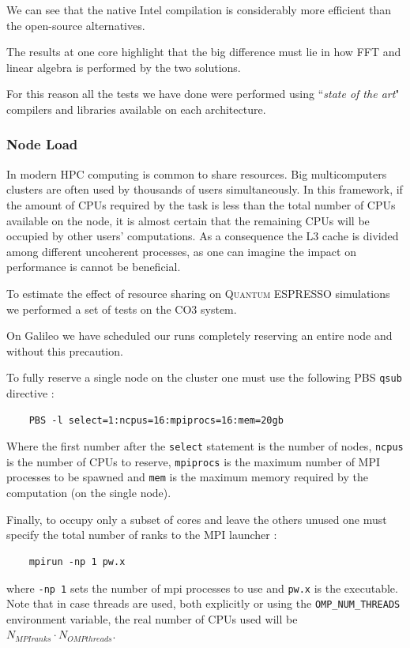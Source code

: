 \documentclass[a4paper,12pt]{article}
\newcommand\QE{\textsc{Quantum} ESPRESSO }
\newcommand\CO{CO3 }
\begin{document}
We can see that the native Intel compilation is considerably more efficient than the open-source alternatives.

The results at one core highlight that the big difference must lie in how FFT and linear algebra is performed by the two solutions. 


\begin{framed}
For this reason all the tests we have done were performed using ``\textit{state of the art}" compilers and libraries available on each architecture.
\end{framed}


\subsubsection{Node Load}

In modern HPC computing is common to share resources. Big multicomputers clusters are often used by thousands of users simultaneously.
In this framework, if the amount of CPUs required by the task is less than the total number of CPUs available on the node, it is almost certain that the remaining CPUs will be occupied by other users' computations.
As a consequence the L3 cache is divided among different uncoherent processes, as one can imagine the impact on performance is cannot be beneficial.

To estimate the effect of resource sharing on \QE simulations we performed a set of tests on the \CO  system. 

On Galileo we have scheduled our runs completely reserving an entire node and without this precaution.

To fully reserve a single node on the cluster one must use the following PBS \texttt{qsub} directive :
\begin{verbatim}
	PBS -l select=1:ncpus=16:mpiprocs=16:mem=20gb
\end{verbatim}

Where the first number after the \texttt{select} statement is the number of nodes, \texttt{ncpus} is the number of CPUs to reserve, \texttt{mpiprocs} is the maximum number of MPI processes to be spawned and \texttt{mem} is the maximum memory required by the computation (on the single node).

Finally, to occupy only a subset of cores and leave the others unused one must specify the total number of ranks to the MPI launcher :
\begin{verbatim}
	mpirun -np 1 pw.x
\end{verbatim}
where \texttt{-np 1} sets the number of mpi processes to use and \texttt{pw.x} is the executable.
Note that in case threads are used, both explicitly or using the \texttt{OMP\_NUM\_THREADS} environment variable, the real number of CPUs used will be $N_{MPI ranks} \cdot N_{OMP threads}$.
\end{document}
